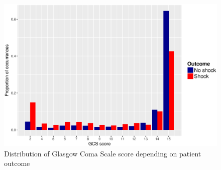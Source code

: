 \begin{figure}[h]
	\centering
   \includegraphics[scale=0.6]{Resources/eda_glasgow}
   \caption{Distribution of Glasgow Coma Scale score depending on patient outcome}
   \label{fig.eda_glasgow}
\end{figure}